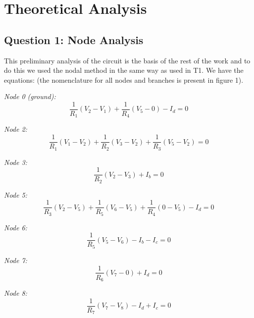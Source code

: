\section{Theoretical Analysis}
\label{sec:analysis}

\subsection{Question 1: Node Analysis}
This preliminary analysis of the circuit is the basis of the rest of the work and to do this we used the nodal method in the same way as used in T1. We have the equations: (the nomenclature for all nodes and branches is present in figure 1).\par
\emph{Node 0 (ground):}
\begin{equation}
    \frac{1}{R_1}(V_2-V_1) + \frac{1}{R_4}(V_5-0)- I_d  = 0
\end{equation}\par

\emph{Node 2:}
\begin{equation}
    \frac{1}{R_1}(V_1-V_2) + \frac{1}{R_2}(V_3-V_2) + \frac{1}{R_3}(V_5-V_2) = 0
\end{equation}\par

\emph{Node 3:}
\begin{equation}
    \frac{1}{R_2}(V_2-V_3) + I_b  = 0
\end{equation}\par

\emph{Node 5:}
\begin{equation}
    \frac{1}{R_3}(V_2-V_5) + \frac{1}{R_5}(V_6-V_5) + \frac{1}{R_4}(0-V_5) - I_d = 0
\end{equation}\par

\emph{Node 6:}
\begin{equation}
    \frac{1}{R_5}(V_5-V_6) - I_b - I_c = 0
\end{equation}\par

\emph{Node 7:}
\begin{equation}
    \frac{1}{R_6}(V_7-0) + I_d  = 0
\end{equation}\par

\emph{Node 8:}
\begin{equation}
    \frac{1}{R_7}(V_7-V_8) - I_d + I_c = 0
\end{equation}\par

